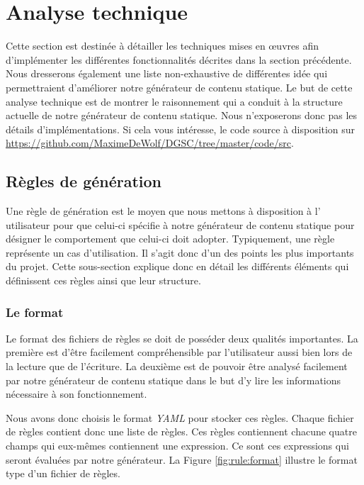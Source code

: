 \section{Analyse technique}
	Cette section est destinée à détailler les techniques mises en œuvres afin d'implémenter les différentes fonctionnalités décrites dans la section précédente. Nous dresserons également une liste non-exhaustive de différentes idée qui permettraient d'améliorer notre générateur de contenu statique. Le but de cette analyse technique est de montrer le raisonnement qui a conduit à la structure actuelle de notre générateur de contenu statique. Nous n'exposerons donc pas les détails d'implémentations. Si cela vous intéresse, le code source à disposition sur \url{https://github.com/MaximeDeWolf/DGSC/tree/master/code/src}.
	
	\subsection{Règles de génération}
	
	Une règle de génération est le moyen que nous mettons à disposition à l' utilisateur pour que celui-ci spécifie à notre générateur de contenu statique pour désigner le comportement que celui-ci doit adopter.
	Typiquement, une règle représente un cas d'utilisation. Il s'agit donc d'un des points les plus importants du projet. Cette sous-section explique donc en détail les différents éléments qui définissent ces règles ainsi que leur structure.
	
	\subsubsection*{Le format}
	
		Le format des fichiers de règles se doit de posséder deux qualités importantes. La première est d'être facilement compréhensible par l'utilisateur aussi bien lors de la lecture que de l'écriture. La deuxième est de pouvoir être analysé facilement par notre générateur de contenu statique dans le but d'y lire les informations nécessaire à son fonctionnement.
		
		Nous avons donc choisis le format \textit{YAML} pour stocker ces règles. Chaque fichier de règles contient donc une liste de règles. Ces règles contiennent chacune quatre champs qui eux-mêmes contiennent une expression. Ce sont ces expressions qui seront évaluées par notre générateur. La Figure \ref{fig:rule:format} illustre le format type d'un fichier de règles.
		
